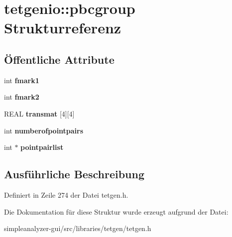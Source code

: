\hypertarget{structtetgenio_1_1pbcgroup}{\section{tetgenio\-:\-:pbcgroup Strukturreferenz}
\label{structtetgenio_1_1pbcgroup}
}
\subsection*{Öffentliche Attribute}
\begin{DoxyCompactItemize}
\item 
\hypertarget{structtetgenio_1_1pbcgroup_af2e1ceaf4bb1ec4420e9ce7dcf5b009f}{int {\bfseries fmark1}}\label{structtetgenio_1_1pbcgroup_af2e1ceaf4bb1ec4420e9ce7dcf5b009f}

\item 
\hypertarget{structtetgenio_1_1pbcgroup_a6a5eeda2d871fa9d220a408eaf37281d}{int {\bfseries fmark2}}\label{structtetgenio_1_1pbcgroup_a6a5eeda2d871fa9d220a408eaf37281d}

\item 
\hypertarget{structtetgenio_1_1pbcgroup_aac987a422e4985c32c8b04654f4e8e16}{R\-E\-A\-L {\bfseries transmat} \mbox{[}4\mbox{]}\mbox{[}4\mbox{]}}\label{structtetgenio_1_1pbcgroup_aac987a422e4985c32c8b04654f4e8e16}

\item 
\hypertarget{structtetgenio_1_1pbcgroup_adbce985d519f6d078f2222ec1b8279ea}{int {\bfseries numberofpointpairs}}\label{structtetgenio_1_1pbcgroup_adbce985d519f6d078f2222ec1b8279ea}

\item 
\hypertarget{structtetgenio_1_1pbcgroup_ac0b5b35f1ec88b265642b2d21144bc72}{int $\ast$ {\bfseries pointpairlist}}\label{structtetgenio_1_1pbcgroup_ac0b5b35f1ec88b265642b2d21144bc72}

\end{DoxyCompactItemize}


\subsection{Ausführliche Beschreibung}


Definiert in Zeile 274 der Datei tetgen.\-h.



Die Dokumentation für diese Struktur wurde erzeugt aufgrund der Datei\-:\begin{DoxyCompactItemize}
\item 
simpleanalyzer-\/gui/src/libraries/tetgen/tetgen.\-h\end{DoxyCompactItemize}
